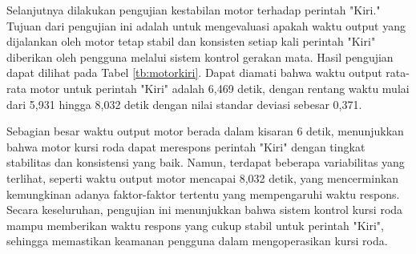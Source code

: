 Selanjutnya dilakukan pengujian kestabilan motor terhadap perintah "Kiri." Tujuan dari pengujian ini adalah untuk mengevaluasi apakah waktu output yang dijalankan oleh motor tetap stabil dan konsisten setiap kali perintah "Kiri" diberikan oleh pengguna melalui sistem kontrol gerakan mata. Hasil pengujian dapat dilihat pada Tabel \ref{tb:motorkiri}. Dapat diamati bahwa waktu output rata-rata motor untuk perintah "Kiri" adalah 6,469 detik, dengan rentang waktu mulai dari 5,931 hingga 8,032 detik dengan nilai standar deviasi sebesar 0,371.

Sebagian besar waktu output motor berada dalam kisaran 6 detik, menunjukkan bahwa motor kursi roda dapat merespons perintah "Kiri" dengan tingkat stabilitas dan konsistensi yang baik. Namun, terdapat beberapa variabilitas yang terlihat, seperti waktu output motor mencapai 8,032 detik, yang mencerminkan kemungkinan adanya faktor-faktor tertentu yang mempengaruhi waktu respons. Secara keseluruhan, pengujian ini menunjukkan bahwa sistem kontrol kursi roda mampu memberikan waktu respons yang cukup stabil untuk perintah "Kiri", sehingga memastikan keamanan pengguna dalam mengoperasikan kursi roda.

